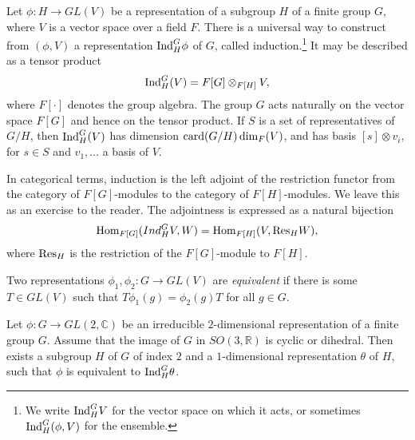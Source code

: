 \documentclass{llncs}
\def\op#1{{\hbox{#1}}}
\newcommand{\ring}[1]{\mathbb{#1}}
\def\newterm#1{{\it #1}}
\def\card#1{\op{card}{#1}}
\begin{document}
Let $\phi:H\to GL(V)$ be a representation of a subgroup $H$ of a
finite group $G$, where $V$ is a vector space over a field $F$.  There
is a universal way to construct from $(\phi,V)$ a representation $\op{Ind}_H^G\phi$ of
$G$, called induction.\footnote{We write $\op{Ind}_H^G V$ for the vector space on
which it acts, or sometimes $\op{Ind}_H^G (\phi,V)$ for the ensemble.}  
It may be described as a tensor product
\[
\op{Ind}_H^G(V) = F[G]\otimes_{F[H]} V,
\]
where $F[\cdot]$ denotes the group algebra.  The group $G$ acts
naturally on the vector space $F[G]$ and hence on the tensor product.
If $S$ is a set of representatives of $G/H$, then $\op{Ind}_H^G(V)$
has dimension $\card(G/H)\dim_F(V)$, and has basis $[s]\otimes v_i$,
for $s\in S$ and $v_1,\ldots $ a basis of $V$.

In categorical terms, induction is the left adjoint of the restriction functor
from the category of  $F[G]$-modules to the category of  $F[H]$-modules.
We leave this as an exercise to the reader.  The adjointness is expressed as a 
natural bijection
\begin{equation}\label{eqn:adjoint}
\op{Hom}_{F[G]}(Ind_H^G V,W) = \op{Hom}_{F[H]}(V,\op{Res}_H W),
\end{equation}
where $\op{Res}_H$ is the restriction of the $F[G]$-module to $F[H]$.

Two representations $\phi_1,\phi_2:G\to GL(V)$ are \newterm{equivalent} if
there is some $T\in GL(V)$ such that $T\phi_1(g) = \phi_2(g)T$ for all $g\in G$.

\begin{theorem}
  Let $\phi:G\to GL(2,\ring{C})$ be an irreducible $2$-dimensional
  representation of a finite group $G$.  Assume that the image of $G$
  in $SO(3,\ring{R})$ is cyclic or dihedral.  Then exists a subgroup
  $H$ of $G$ of index $2$ and a $1$-dimensional representation
  $\theta$ of $H$, such that $\phi$ is equivalent to
  $\op{Ind}_H^G\theta$.
\end{theorem}
\end{document}

